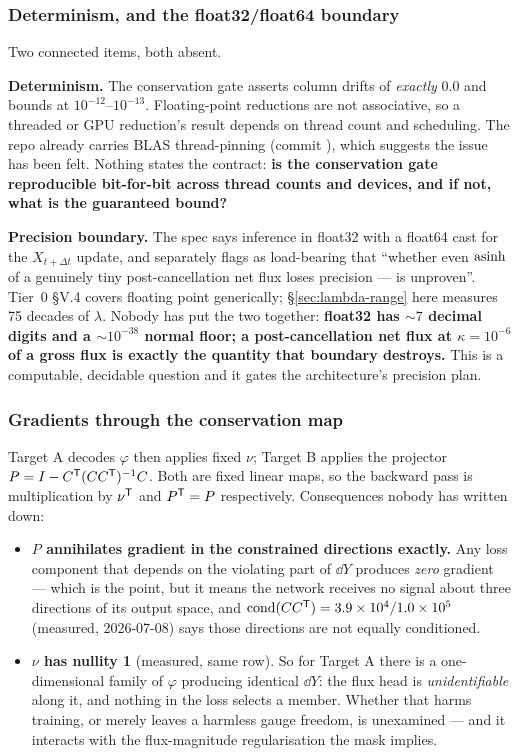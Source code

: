 \subsubsection{Determinism, and the float32/float64 boundary}
\label{sec:gap-determinism}

Two connected items, both absent.

\textbf{Determinism.} The conservation gate asserts column drifts of
\emph{exactly} 0.0 and bounds at $10^{-12}$--$10^{-13}$. Floating-point
reductions are not associative, so a threaded or GPU reduction's result depends
on thread count and scheduling. The repo already carries BLAS thread-pinning
(commit ), which suggests the issue has been felt. Nothing states
the contract: \textbf{is the conservation gate reproducible bit-for-bit across
thread counts and devices, and if not, what is the guaranteed bound?}

\textbf{Precision boundary.} The spec says inference in float32 with a float64
cast for the $X_{t+\Delta t}$ update, and separately flags as load-bearing that
``whether even $\operatorname{asinh}$ of a genuinely tiny post-cancellation net flux loses
precision --- is unproven''. Tier~0 \S V.4 covers floating point generically;
\S\ref{sec:lambda-range} here measures 75 decades of $\lambda$. Nobody has put
the two together: \textbf{float32 has ${\sim}7$ decimal digits and a
${\sim}10^{-38}$ normal floor; a post-cancellation net flux at
$\kappa = 10^{-6}$ of a gross flux is exactly the quantity that boundary
destroys.} This is a computable, decidable question and it gates the
architecture's precision plan.

\subsubsection{Gradients through the conservation map}
\label{sec:gap-gradients}

Target A decodes $\varphi$ then applies fixed $\nu$; Target B applies the
projector $P = I - C^{\mathsf{T}}(CC^{\mathsf{T}})^{-1}C$. Both are fixed linear maps, so the
backward pass is multiplication by $\nu^{\mathsf{T}}$ and $P^{\mathsf{T}} = P$ respectively.
Consequences nobody has written down:

\begin{itemize}
\item \textbf{$P$ annihilates gradient in the constrained directions exactly.}
      Any loss component that depends on the violating part of $\dd Y$ produces
      \emph{zero} gradient --- which is the point, but it means the network
      receives no signal about three directions of its output space, and
      $\operatorname{cond}(CC^{\mathsf{T}}) = 3.9\times10^4 / 1.0\times10^5$ (measured,
       2026-07-08) says those directions are not equally
      conditioned.
\item \textbf{$\nu$ has nullity 1} (measured, same row). So for Target A there
      is a one-dimensional family of $\varphi$ producing identical $\dd Y$: the
      flux head is \emph{unidentifiable} along it, and nothing in the loss
      selects a member. Whether that harms training, or merely leaves a harmless
      gauge freedom, is unexamined --- and it interacts with the flux-magnitude
      regularisation the mask implies.
\end{itemize}

